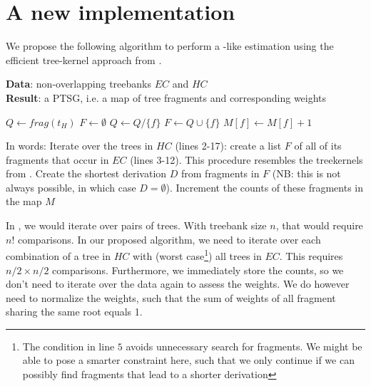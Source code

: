 \section{A new implementation}


We propose the following algorithm to perform a \dops{}-like estimation using the efficient tree-kernel approach from \ddop{}.

\begin{algorithm}[H]
{\bf Data}: non-overlapping treebanks $EC$ and $HC$\\
{\bf Result}: a PTSG, i.e. a map of tree fragments and corresponding weights\\
\begin{algorithmic}[1]
	\State $Q\gets frag(t_H)$
	\State $F \gets \emptyset$
				\State $Q\gets Q/\{f\}$	
				\State $F\gets Q\cup\{f\}$	
			\EndFor
		\EndFor
	\EndWhile
		\State $M[f]\gets M[f]+1$
	\EndFor
\EndFor
{}
\EndFor	
\end{algorithmic}
\end{algorithm}

In words:
Iterate over the trees in $HC$ (lines 2-17): create a list $F$ of all of its fragments that occur in $EC$ (lines 3-12). This procedure resembles the treekernels from \ddop.
Create the shortest derivation $D$ from fragments in $F$ (NB: this is not always possible, in which case $D=\emptyset$). Increment the counts of these fragments in the map $M$

In \ddop, we would iterate over pairs of trees. With treebank size $n$, that would require $n!$ comparisons. In our proposed algorithm, we need to iterate over each combination of a tree in $HC$ with (worst case\footnote{The condition in line $5$ avoids unnecessary search for fragments. We might be able to pose a smarter constraint here, such that we only continue if we can possibly find fragments that lead to a shorter derivation}) all trees in $EC$. This requires $n/2 \times n/2$ comparisons. Furthermore, we immediately store the counts, so we don't need to iterate over the data again to assess the weights. We do however need to normalize the weights, such that the sum of weights of all fragment sharing the same root equals 1.